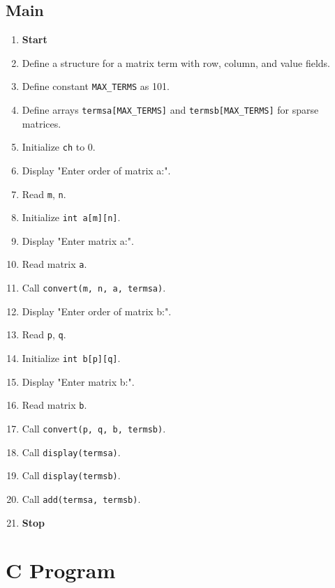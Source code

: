 {  \subsection{Main}

  \begin{enumerate}[label=\arabic*:,left=0pt]
    \item \textbf{Start}
    \item Define a structure for a matrix term with row, column, and value fields.
    \item Define constant \texttt{MAX\_TERMS} as 101.\
    \item Define arrays \texttt{termsa[MAX\_TERMS]} and \texttt{termsb[MAX\_TERMS]} for sparse matrices.
    \item Initialize \texttt{ch} to 0.
    \item Display "Enter order of matrix a:".
    \item Read \texttt{m}, \texttt{n}.
    \item Initialize \texttt{int a[m][n]}.
    \item Display "Enter matrix a:".
    \item Read matrix \texttt{a}.
    \item Call \texttt{convert(m, n, a, termsa)}.
    \item Display "Enter order of matrix b:".
    \item Read \texttt{p}, \texttt{q}.
    \item Initialize \texttt{int b[p][q]}.
    \item Display "Enter matrix b:".
    \item Read matrix \texttt{b}.
    \item Call \texttt{convert(p, q, b, termsb)}.
    \item Call \texttt{display(termsa)}.
    \item Call \texttt{display(termsb)}.
    \item Call \texttt{add(termsa, termsb)}.
    \item \textbf{Stop}
  \end{enumerate}
 }

\section{C Program}

